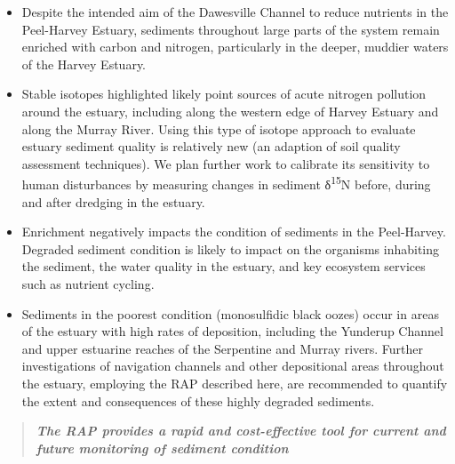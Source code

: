 \documentclass[
]{book}
\begin{document}
\begin{itemize}
\item
  Despite the intended aim of the Dawesville Channel to reduce nutrients in the Peel-Harvey Estuary, sediments throughout large parts of the system remain enriched with carbon and nitrogen, particularly in the deeper, muddier waters of the Harvey Estuary.
\item
  Stable isotopes highlighted likely point sources of acute nitrogen pollution around the estuary, including along the western edge of Harvey Estuary and along the Murray River. Using this type of isotope approach to evaluate estuary sediment quality is relatively new (an adaption of soil quality assessment techniques). We plan further work to calibrate its sensitivity to human disturbances by measuring changes in sediment δ\textsuperscript{15}N before, during and after dredging in the estuary.
\item
  Enrichment negatively impacts the condition of sediments in the Peel-Harvey. Degraded sediment condition is likely to impact on the organisms inhabiting the sediment, the water quality in the estuary, and key ecosystem services such as nutrient cycling.
\item
  Sediments in the poorest condition (monosulfidic black oozes) occur in areas of the estuary with high rates of deposition, including the Yunderup Channel and upper estuarine reaches of the Serpentine and Murray rivers. Further investigations of navigation channels and other depositional areas throughout the estuary, employing the RAP described here, are recommended to quantify the extent and consequences of these highly degraded sediments.
\end{itemize}

\begin{quote}
\textbf{\emph{The RAP provides a rapid and cost-effective tool for current and future monitoring of sediment condition}}
\end{quote}
\end{document}
